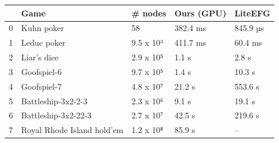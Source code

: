 \begin{tabular}{lllll}
\toprule
 & Game & # nodes & Ours (GPU) & LiteEFG \\
\midrule
0 & Kuhn poker & 58 & 382.4 ms & 845.9 µs \\
1 & Leduc poker & 9.5 x 10³ & 411.7 ms & 60.4 ms \\
2 & Liar's dice & 2.9 x 10⁵ & 1.1 s & 2.8 s \\
3 & Goofspiel-6 & 9.7 x 10⁵ & 1.4 s & 10.3 s \\
4 & Goofspiel-7 & 4.8 x 10⁷ & 21.2 s & 553.6 s \\
5 & Battleship-3x2-2-3 & 2.3 x 10⁶ & 9.1 s & 19.1 s \\
6 & Battleship-3x2-22-3 & 2.7 x 10⁷ & 42.5 s & 219.6 s \\
7 & Royal Rhode Island hold'em & 1.2 x 10⁸ & 85.9 s & -- \\
\bottomrule
\end{tabular}
